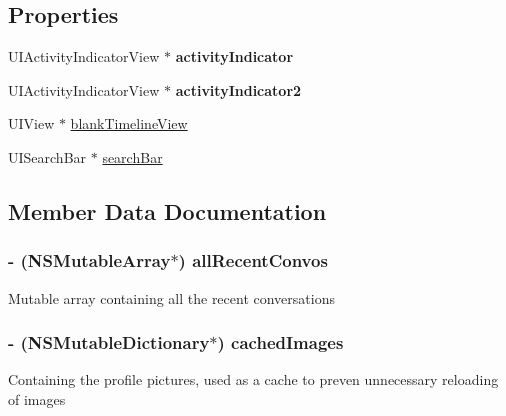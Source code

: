 \subsection*{Properties}
\begin{DoxyCompactItemize}
\item 
\hypertarget{category_e_s_recent_view_07_08_a19358243e07a0abea4a21d6ece31b898}{}U\+I\+Activity\+Indicator\+View $\ast$ {\bfseries activity\+Indicator}\label{category_e_s_recent_view_07_08_a19358243e07a0abea4a21d6ece31b898}

\item 
\hypertarget{category_e_s_recent_view_07_08_a898818d2b2c5362619c9c5dad589c3c4}{}U\+I\+Activity\+Indicator\+View $\ast$ {\bfseries activity\+Indicator2}\label{category_e_s_recent_view_07_08_a898818d2b2c5362619c9c5dad589c3c4}

\item 
U\+I\+View $\ast$ \hyperlink{category_e_s_recent_view_07_08_a9caa6fa62a029b035245a785d01aa053}{blank\+Timeline\+View}
\item 
U\+I\+Search\+Bar $\ast$ \hyperlink{category_e_s_recent_view_07_08_a5691c509462de8746726d7ffa92b4a1d}{search\+Bar}
\end{DoxyCompactItemize}


\subsection{Member Data Documentation}
\hypertarget{category_e_s_recent_view_07_08_ab0daaff918a5dbaee89f15e0428a9b3e}{}
\subsubsection[{all\+Recent\+Convos}]{\setlength{\rightskip}{0pt plus 5cm}-\/ (N\+S\+Mutable\+Array$\ast$) all\+Recent\+Convos\hspace{0.3cm}{\ttfamily [protected]}}\label{category_e_s_recent_view_07_08_ab0daaff918a5dbaee89f15e0428a9b3e}
Mutable array containing all the recent conversations \hypertarget{category_e_s_recent_view_07_08_ad8f47f7ca6633ae6955f2a06254e4cd5}{}
\subsubsection[{cached\+Images}]{\setlength{\rightskip}{0pt plus 5cm}-\/ (N\+S\+Mutable\+Dictionary$\ast$) cached\+Images\hspace{0.3cm}{\ttfamily [protected]}}\label{category_e_s_recent_view_07_08_ad8f47f7ca6633ae6955f2a06254e4cd5}
Containing the profile pictures, used as a cache to preven unnecessary reloading of images \hypertarget{category_e_s_recent_view_07_08_aac4c56d218e6afbfbdbcc1dcb8ef737a}{}
